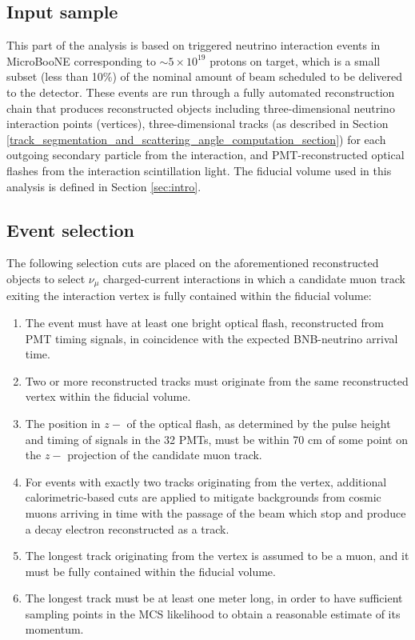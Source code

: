 \documentclass[a4paper,11pt]{article}
\begin{document}
\subsection{Input sample}\label{input_sample_section}
This part of the analysis is based on triggered neutrino interaction events in MicroBooNE corresponding to $\sim 5 \times 10^{19}$ protons on target, which is a small subset (less than 10\%) of the nominal amount of beam scheduled to be delivered to the detector. These events are run through a fully automated reconstruction chain that produces reconstructed objects including three-dimensional neutrino interaction points (vertices), three-dimensional tracks (as described in Section \ref{track_segmentation_and_scattering_angle_computation_section}) for each outgoing secondary particle from the interaction, and PMT-reconstructed optical flashes from the interaction scintillation light. The fiducial volume used in this analysis is defined in Section \ref{sec:intro}.

\subsection{Event selection}
The following selection cuts are placed on the aforementioned reconstructed objects to select $\nu_\mu$ charged-current interactions in which a candidate muon track exiting the interaction vertex is fully contained within the fiducial volume:
\begin{enumerate}
\item The event must have at least one bright optical flash, reconstructed from PMT timing signals, in coincidence with the expected BNB-neutrino arrival time.
\item Two or more reconstructed tracks must originate from the same reconstructed vertex within the fiducial volume.
\item The position in $z-$ of the optical flash, as determined by the pulse height and timing of signals in the 32 PMTs, must be within 70 cm of some point on the $z-$ projection of the candidate muon track.
\item For events with exactly two tracks originating from the vertex, additional calorimetric-based cuts are applied to mitigate backgrounds from cosmic muons arriving in time with the passage of the beam which stop and produce a decay electron reconstructed as a track.
\item The longest track originating from the vertex is assumed to be a muon, and it must be fully contained within the fiducial volume.
\item The longest track must be at least one meter long, in order to have sufficient sampling points in the MCS likelihood to obtain a reasonable estimate of its momentum.
\end{enumerate}
\end{document}

